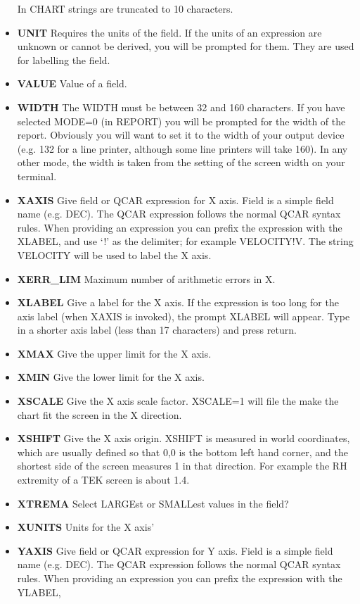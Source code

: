 \begin{itemize}
In CHART strings are truncated to 10 characters.
\item{\bf UNIT} Requires the units of the field.
If the units of an expression are unknown or cannot be derived, you will
be prompted for them.
They are used for labelling the field.
\item{\bf VALUE} Value of a field.
\item{\bf WIDTH} The WIDTH must be between 32 and 160 characters.
If you have selected MODE=0 (in REPORT) you will be prompted for the width
of the report.
Obviously you will want to set it to the width of your output device
(e.g. 132 for a line printer, although some line printers will take 160).
In any other mode, the width is taken from the setting of the screen width
on your terminal.
\item{\bf XAXIS} Give field or QCAR expression for X axis.
Field is a simple field name (e.g. DEC).
The QCAR expression follows the normal QCAR syntax rules.
When providing an expression you can prefix the expression with the XLABEL,
and use `!' as the delimiter; for example VELOCITY!V.
The string VELOCITY will be used to label the X axis.
\item {\bf XERR\_LIM} Maximum number of arithmetic errors in X.
\item{\bf XLABEL} Give a label for the X axis.
If the expression is too long for the axis label (when XAXIS is invoked),
the prompt XLABEL will appear.
Type in a shorter axis label (less than 17 characters) and press return.
\item{\bf XMAX} Give the upper limit for the X axis.
\item{\bf XMIN} Give the lower limit for the X axis.
\item{\bf XSCALE} Give the X axis scale factor.
XSCALE=1 will file the make the chart fit the screen in the X direction.
\item{\bf XSHIFT} Give the X axis origin.
XSHIFT is measured in world coordinates,  which are usually defined so that
0,0 is the bottom left hand corner, and the shortest side of the screen
measures 1 in that direction.
For example the RH extremity of a TEK screen is about 1.4.
\item{\bf XTREMA} Select LARGEst or SMALLest values in the field?
\item{\bf XUNITS} Units for the X axis'
\item{\bf YAXIS} Give field or QCAR expression for Y axis.
Field is a simple field name (e.g. DEC).
The QCAR expression follows the normal QCAR syntax rules.
When providing an expression you can prefix the expression with the YLABEL,

\end{itemize}
